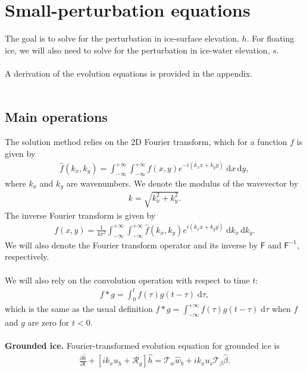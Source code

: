\documentclass[paper=a4, fontsize=11pt]{article}
\begin{document}
\section*{Small-perturbation equations}
The goal is to solve for the perturbation in ice-surface elevation, $h$.
For floating ice, we will also need to solve for the perturbation
in ice-water elevation, $s$. \\ \\
A derivation of the evolution equations is provided in the appendix.
\\ \\
\subsection*{Main operations}
The solution method relies on the 2D Fourier transform, which for a function $f$
is given by
\begin{align}
\widehat{f}(k_x,k_y)  = \int_{-\infty}^{+\infty}\int_{-\infty}^{+\infty} f(x,y)e^{-i(k_x x + k_y y)} \; \mathrm{d}x\,\mathrm{d}y,
\end{align}
where $k_x$ and $k_y$ are wavenumbers. We denote the modulus of the wavevector by
\begin{align}
k = \sqrt{k_x^2 + k_y^2}.
\end{align}
The inverse Fourier transform is given by
\begin{align}
{f}(x,y) = \frac{1}{4\pi^2}\int_{-\infty}^{+\infty}\int_{-\infty}^{+\infty} \widehat{f}(k_x,k_y)e^{i(k_x x + k_y y)} \; \mathrm{d}k_x \, \mathrm{d}k_y.
\end{align}
We will also denote the Fourier transform operator and its inverse by $\mathsf{F}$ and
$\mathsf{F}^{-1}$, respectively.
\\ \\
We will also rely on the convolution operation with respect to time $t$:
\begin{align}
f*g = \int_0^t f(\tau)g(t-\tau)\;\mathrm{d}\tau,
\end{align}
which is the same as the usual definition $f*g = \int_{-\infty}^{+\infty} f(\tau)g(t-\tau)\;\mathrm{d}\tau$
when $f$ and $g$ are zero for $t<0$.
\\ \\
\textbf{Grounded ice.} Fourier-transformed evolution equation for grounded ice is
\begin{align}
\frac{\partial \widehat{h}}{\partial t}+ \left[ik_xu_h  + \mathcal{R}_g\right]\widehat{h} = \mathcal{T}_w\widehat{w}_b+ik_xu_s\mathcal{T}_{\beta} \widehat{\beta}.
\end{align}
\end{document}
